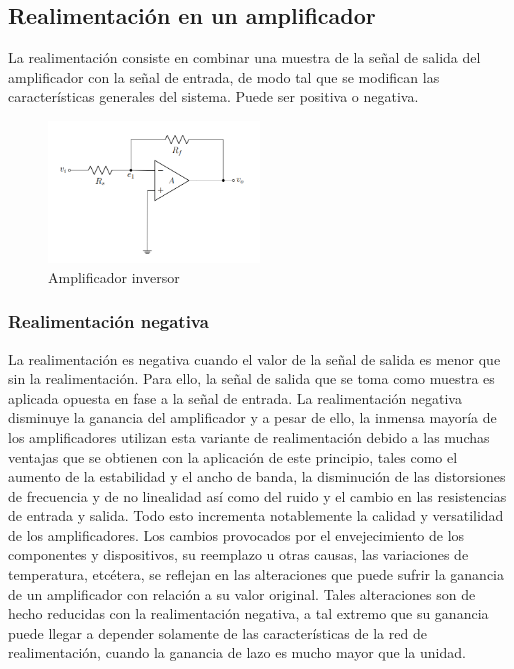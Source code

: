 \subsection{Realimentación en un amplificador}

La realimentación consiste en combinar una muestra de la señal de salida del amplificador
con la señal de entrada, de modo tal que se modifican las características generales del
sistema. Puede ser positiva o negativa.


\begin{figure}[ht]
    \centering
    \includegraphics[width=0.5\textwidth]{src/images/marco-teorico/amplificador-inversor.png}
    \caption{Amplificador inversor}
    \label{fig:mt-amplificador-inversor}
\end{figure}


\subsubsection{Realimentación negativa}

La realimentación es negativa cuando el valor de la señal de salida es menor que sin la
realimentación. Para ello, la señal de salida que se toma como muestra es aplicada opuesta
en fase a la señal de entrada.
La realimentación negativa disminuye la ganancia del amplificador y a pesar de ello, la
inmensa mayoría de los amplificadores utilizan esta variante de realimentación debido a las
muchas ventajas que se obtienen con la aplicación de este principio, tales como el aumento
de la estabilidad y el ancho de banda, la disminución de las distorsiones de frecuencia y de
no linealidad así como del ruido y el cambio en las resistencias de entrada y salida. Todo
esto incrementa notablemente la calidad y versatilidad de los amplificadores.
Los cambios provocados por el envejecimiento de los componentes y dispositivos, su
reemplazo u otras causas, las variaciones de temperatura, etcétera, se reflejan en las alteraciones que puede sufrir la ganancia de un amplificador con relación a su valor original. Tales
alteraciones son de hecho reducidas con la realimentación negativa, a tal extremo que su ganancia puede llegar a depender solamente de las características de la red de realimentación,
cuando la ganancia de lazo es mucho mayor que la unidad.


